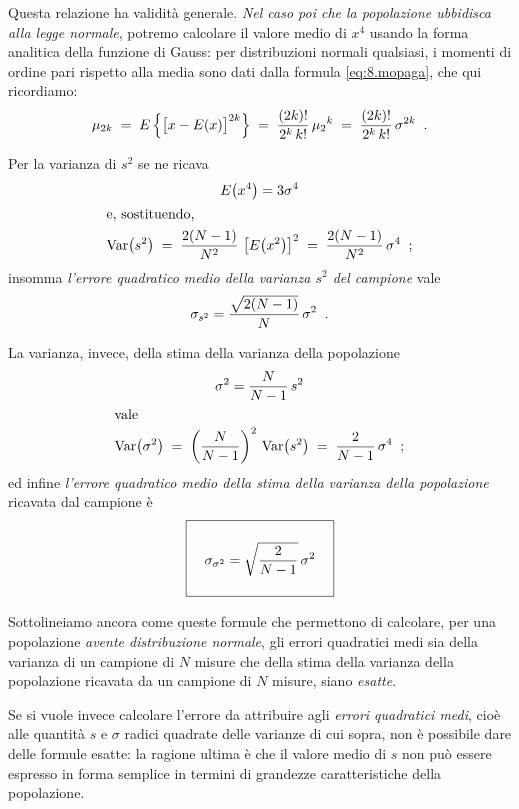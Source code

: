 Questa relazione ha validit\`a generale.  \emph{Nel caso poi
  che la popolazione ubbidisca alla legge normale}, potremo
calcolare il valore medio di $ x^4 $ usando la forma
analitica della funzione di Gauss: per distribuzioni normali
qualsiasi, i momenti di ordine pari rispetto alla media sono
dati dalla formula \eqref{eq:8.mopaga}, che qui ricordiamo:
\begin{equation*}
  \mu_{2k} \; = \; E \left\{ \bigl[ x - E(x)
    \bigr]^{2k} \right\} \; = \; \frac{(2k)!}{2^k \,
    k!} \, {\mu_2} ^k \; = \; \frac{(2k)!}{2^k \, k!}
    \, \sigma^{2k} \;\; .
\end{equation*}

Per la varianza di $s^2$ se ne ricava
\begin{gather*}
  E \bigl( x^4 \bigr) = 3 \sigma^4 \\
  \intertext{e, sostituendo,}
  \operatorname{Var} \bigl( s^2 \bigr) \; = \;
    \frac{2(N-1)}{N^2} \, \left[ E \bigl(
    x^2 \bigr) \right] ^2 \; = \;
    \frac{2(N-1)}{N^2} \, \sigma^4 \;\; ;
\end{gather*}
insomma \emph{l'errore quadratico medio della varianza $s^2$
  del campione} vale
\begin{equation*}
  \sigma_{s^2} = \frac{\sqrt{2(N-1)}}{N}
    \, \sigma^2 \;\; .
\end{equation*}

La varianza, invece, della stima della varianza della
popolazione
\begin{gather*}
  \sigma^2 = \frac{N}{N-1} \, s^2 \\
  \intertext{vale}
  \operatorname{Var} \bigl( \sigma^2 \bigr) \; = \;
    \left( \frac{N}{N-1} \right) ^2 \,
    \operatorname{Var} \bigl( s^2 \bigr) \; = \;
    \frac{2}{N-1} \, \sigma^4 \;\; ;
\end{gather*}
ed infine \emph{l'errore quadratico medio della stima della
  varianza della popolazione} ricavata dal campione \`e
\begin{equation*}%
\index{errore!della varianza stimata}
  \boxed{ \rule[-7mm]{0mm}{17mm} \quad
    \sigma_{\sigma^2} = \sqrt{
    \dfrac{2}{N-1} }
    \, \sigma^2 \quad}
\end{equation*}

Sottolineiamo ancora come queste formule che permettono di
calcolare, per una popolazione \emph{avente distribuzione
  normale}, gli errori quadratici medi sia della varianza di
un campione di $N$ misure che della stima della varianza
della popolazione ricavata da un campione di $N$ misure,
siano \emph{esatte}.

Se si vuole invece calcolare l'errore da attribuire agli
\emph{errori quadratici medi}, cio\`e alle quantit\`a $s$ e
$\sigma$ radici quadrate delle varianze di cui sopra, non
\`e possibile dare delle formule esatte: la ragione ultima
\`e che il valore medio di $s$ non pu\`o essere espresso in
forma semplice in termini di grandezze caratteristiche della
popolazione.


